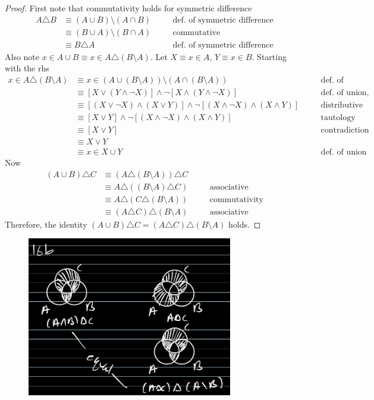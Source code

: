 \begin{proof}
First note that commutativity holds for symmetric difference
\begin{align*}
A \triangle B &\equiv (A \cup B) \setminus (A \cap B) && \quad \text{def. of symmetric difference} \\
&\equiv (B \cup A) \setminus (B \cap A)  && \quad \text{commutative} \\
&\equiv B \triangle A && \quad \text{def. of symmetric difference}
\end{align*}
Also note $x \in A \cup B \equiv x \in A \triangle (B \setminus A)$.
Let $X \equiv x \in A$, $Y \equiv x \in B$.
Starting with the rhs
\begin{align*}
x \in A \triangle (B \setminus A) &\equiv x \in (A \cup (B \setminus A)) \setminus (A \cap (B \setminus A)) && \quad \text{def. of symmetric difference} \\
&\equiv [X \vee (Y \wedge \neg X)] \wedge \neg [X \wedge (Y \wedge \neg X)] && \quad \text{def. of union, intersection, set difference} \\
&\equiv [(X \vee \neg X) \wedge (X \vee Y)] \wedge \neg [(X \wedge \neg X) \wedge (X \wedge Y)] && \quad \text{distributive} \\
&\equiv [X \vee Y] \wedge \neg [(X \wedge \neg X) \wedge (X \wedge Y)] && \quad \text{tautology} \\
&\equiv [X \vee Y] && \quad \text{contradiction} \\
&\equiv X \vee Y && \quad \text{} \\
&\equiv x \in X \cup Y && \quad \text{def. of union}
\end{align*}
Now
\begin{align*}
(A \cup B) \triangle C &\equiv (A \triangle (B \setminus A)) \triangle C && \\
&\equiv A \triangle ((B \setminus A) \triangle C) && \quad \text{associative} \\
&\equiv A \triangle (C \triangle (B \setminus A)) && \quad \text{commutativity} \\
&\equiv (A \triangle C) \triangle (B \setminus A) && \quad \text{associative}
\end{align*}
Therefore, the identity $(A \cup B) \triangle C = (A \triangle C) \triangle (B \setminus A)$ holds.
\end{proof}
\begin{figure}[H]
    \centering
    \includegraphics[width=0.8\textwidth]{images/1.2/26.PNG}
\end{figure}
